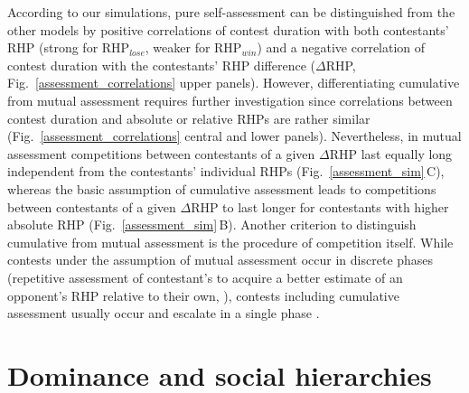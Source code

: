 \documentclass[11pt,pdftex]{article}
\newcommand{\panel}[1]{\textsf{#1}}
\newcommand{\fref}[1]{\textup{\ref{#1}}}
\newcommand{\subfref}[2]{\textup{\ref{#1}}\,\panel{#2}}
\newcommand{\fig}{Fig.}
\newcommand{\figref}[1]{\fig~\fref{#1}}
\newcommand{\subfigref}[2]{\fig~\subfref{#1}{#2}}
\newcommand{\figb}{Fig.}
\newcommand{\figrefb}[1]{\figb~\fref{#1}}
\begin{document}
According to our simulations, pure self-assessment can be distinguished from the other models by positive correlations of contest duration with both contestants' RHP (strong for RHP$_{lose}$, weaker for RHP$_{win}$) and a negative correlation of contest duration with the contestants' RHP difference ($\Delta$RHP, \figrefb{assessment_correlations} upper panels). However, differentiating cumulative from mutual assessment requires further investigation since correlations between contest duration and absolute or relative RHPs are rather similar (\figref{assessment_correlations} central and lower panels). Nevertheless, in mutual assessment competitions between contestants of a given $\Delta$RHP last equally long independent from the contestants' individual RHPs (\subfigref{assessment_sim}{C}), whereas the basic assumption of cumulative assessment leads to competitions between contestants of a given $\Delta$RHP to last longer for contestants with higher absolute RHP (\subfigref{assessment_sim}{B}). Another criterion to distinguish cumulative from mutual assessment is the procedure of competition itself. While contests under the assumption of mutual assessment occur in discrete phases (repetitive assessment of contestant's to acquire a better estimate of an opponent's RHP relative to their own, \citealp{EnquistLeimar1987, Enquist1990}), contests including cumulative assessment usually occur and escalate in a single phase \citep{Payne1998}. 

\section{Dominance and social hierarchies}
\end{document}
